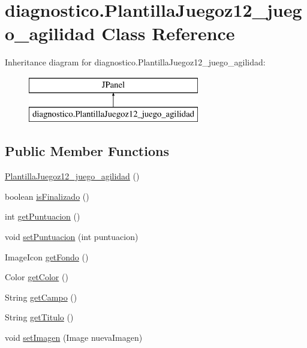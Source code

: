 \hypertarget{classdiagnostico_1_1_plantilla_juegoz12__juego__agilidad}{}\section{diagnostico.\+Plantilla\+Juegoz12\+\_\+juego\+\_\+agilidad Class Reference}
\label{classdiagnostico_1_1_plantilla_juegoz12__juego__agilidad}
Inheritance diagram for diagnostico.\+Plantilla\+Juegoz12\+\_\+juego\+\_\+agilidad\+:\begin{figure}[H]
\begin{center}
\leavevmode
\includegraphics[height=2.000000cm]{classdiagnostico_1_1_plantilla_juegoz12__juego__agilidad}
\end{center}
\end{figure}
\subsection*{Public Member Functions}
\begin{DoxyCompactItemize}
\item 
\mbox{\hyperlink{classdiagnostico_1_1_plantilla_juegoz12__juego__agilidad_a88cee477931158c55eac6df711fedb44}{Plantilla\+Juegoz12\+\_\+juego\+\_\+agilidad}} ()
\item 
boolean \mbox{\hyperlink{classdiagnostico_1_1_plantilla_juegoz12__juego__agilidad_a391a3a125285c2b98054ef2f6efea1d5}{is\+Finalizado}} ()
\item 
int \mbox{\hyperlink{classdiagnostico_1_1_plantilla_juegoz12__juego__agilidad_a0ffb41957e0c3a45fb1dd5bcbb4ef9d5}{get\+Puntuacion}} ()
\item 
void \mbox{\hyperlink{classdiagnostico_1_1_plantilla_juegoz12__juego__agilidad_ad512eb78e5944725f2b51903d423ef7e}{set\+Puntuacion}} (int puntuacion)
\item 
Image\+Icon \mbox{\hyperlink{classdiagnostico_1_1_plantilla_juegoz12__juego__agilidad_a4d7aa9abd4c8128f1ea967467630f1ef}{get\+Fondo}} ()
\item 
Color \mbox{\hyperlink{classdiagnostico_1_1_plantilla_juegoz12__juego__agilidad_aae992d91789719622b6f46ab954a454e}{get\+Color}} ()
\item 
String \mbox{\hyperlink{classdiagnostico_1_1_plantilla_juegoz12__juego__agilidad_a00aaa31fae6609c02ec824875b9e047b}{get\+Campo}} ()
\item 
String \mbox{\hyperlink{classdiagnostico_1_1_plantilla_juegoz12__juego__agilidad_afbc97bd77cae0acad5d7d0519ef452ad}{get\+Titulo}} ()
\item 
void \mbox{\hyperlink{classdiagnostico_1_1_plantilla_juegoz12__juego__agilidad_a0cacf194953b7902dd48aa93e9c3a11c}{set\+Imagen}} (Image nueva\+Imagen)
\end{DoxyCompactItemize}

